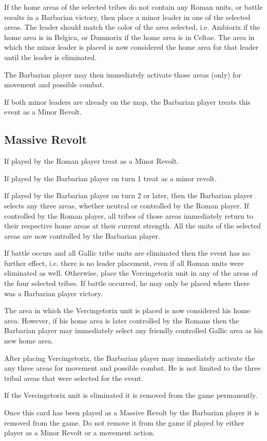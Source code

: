 If the home areas of the selected tribes do not contain any Roman units, or battle results in a Barbarian victory, then place a minor leader in one of the selected areas. The leader should match the color of the area selected, i.e. Ambiorix if the home area is in Belgica, or Dumnorix if the home area is in Celtae. The area in which the minor leader is placed is now considered the home area for that leader until the leader is eliminated.

The Barbarian player may then immediately activate those areas (only) for movement and possible combat.

If both minor leaders are already on the map, the Barbarian player treats this event as a Minor Revolt.

\subsection{Massive Revolt}
If played by the Roman player treat as a Minor Revolt.

If played by the Barbarian player on turn 1 treat as a minor revolt.

If played by the Barbarian player on turn 2 or later, then the Barbarian player selects any three areas, whether neutral or controlled by the Roman player. If controlled by the Roman player, all tribes of those areas immediately return to their respective home areas at their current strength. All the units of the selected areas are now controlled by the Barbarian player.

If battle occurs and all Gallic tribe units are eliminated then the event has no further effect, i.e. there is no leader placement, even if all Roman units were eliminated as well. Otherwise, place the Vercingetorix unit in any of the areas of the four selected tribes. If battle occurred, he may only be placed where there was a Barbarian player victory.

The area in which the Vercingetorix unit is placed is now considered his home area. However, if his home area is later controlled by the Romans then the Barbarian player may immediately select any friendly controlled
Gallic area as his new home area.

After placing Vercingetorix, the Barbarian player may immediately activate the any three areas for movement and possible combat. He is not limited to the three tribal areas that were selected for the event. 

If the Vercingetorix unit is eliminated it is removed from the game permanently.

Once this card has been played as a Massive Revolt by the Barbarian player it is removed from the game. Do not remove it from the game if played by either player as a Minor Revolt or a movement action.